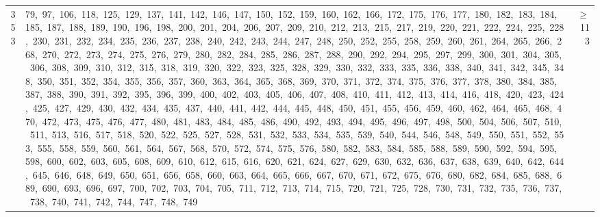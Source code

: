 \begin{longtable}{c|p{}|r}
353 & 79,\ 97,\ 106,\ 118,\ 125,\ 129,\ 137,\ 141,\ 142,\ 146,\ 147,\ 150,\ 152,\ 159,\ 160,\ 162,\ 166,\ 172,\ 175,\ 176,\ 177,\ 180,\ 182,\ 183,\ 184,\ 185,\ 187,\ 188,\ 189,\ 190,\ 196,\ 198,\ 200,\ 201,\ 204,\ 206,\ 207,\ 209,\ 210,\ 212,\ 213,\ 215,\ 217,\ 219,\ 220,\ 221,\ 222,\ 224,\ 225,\ 228,\ 230,\ 231,\ 232,\ 234,\ 235,\ 236,\ 237,\ 238,\ 240,\ 242,\ 243,\ 244,\ 247,\ 248,\ 250,\ 252,\ 255,\ 258,\ 259,\ 260,\ 261,\ 264,\ 265,\ 266,\ 268,\ 270,\ 272,\ 273,\ 274,\ 275,\ 276,\ 279,\ 280,\ 282,\ 284,\ 285,\ 286,\ 287,\ 288,\ 290,\ 292,\ 294,\ 295,\ 297,\ 299,\ 300,\ 301,\ 304,\ 305,\ 306,\ 308,\ 309,\ 310,\ 312,\ 315,\ 318,\ 319,\ 320,\ 322,\ 323,\ 325,\ 328,\ 329,\ 330,\ 332,\ 333,\ 335,\ 336,\ 338,\ 340,\ 341,\ 342,\ 345,\ 348,\ 350,\ 351,\ 352,\ 354,\ 355,\ 356,\ 357,\ 360,\ 363,\ 364,\ 365,\ 368,\ 369,\ 370,\ 371,\ 372,\ 374,\ 375,\ 376,\ 377,\ 378,\ 380,\ 384,\ 385,\ 387,\ 388,\ 390,\ 391,\ 392,\ 395,\ 396,\ 399,\ 400,\ 402,\ 403,\ 405,\ 406,\ 407,\ 408,\ 410,\ 411,\ 412,\ 413,\ 414,\ 416,\ 418,\ 420,\ 423,\ 424,\ 425,\ 427,\ 429,\ 430,\ 432,\ 434,\ 435,\ 437,\ 440,\ 441,\ 442,\ 444,\ 445,\ 448,\ 450,\ 451,\ 455,\ 456,\ 459,\ 460,\ 462,\ 464,\ 465,\ 468,\ 470,\ 472,\ 473,\ 475,\ 476,\ 477,\ 480,\ 481,\ 483,\ 484,\ 485,\ 486,\ 490,\ 492,\ 493,\ 494,\ 495,\ 496,\ 497,\ 498,\ 500,\ 504,\ 506,\ 507,\ 510,\ 511,\ 513,\ 516,\ 517,\ 518,\ 520,\ 522,\ 525,\ 527,\ 528,\ 531,\ 532,\ 533,\ 534,\ 535,\ 539,\ 540,\ 544,\ 546,\ 548,\ 549,\ 550,\ 551,\ 552,\ 553,\ 555,\ 558,\ 559,\ 560,\ 561,\ 564,\ 567,\ 568,\ 570,\ 572,\ 574,\ 575,\ 576,\ 580,\ 582,\ 583,\ 584,\ 585,\ 588,\ 589,\ 590,\ 592,\ 594,\ 595,\ 598,\ 600,\ 602,\ 603,\ 605,\ 608,\ 609,\ 610,\ 612,\ 615,\ 616,\ 620,\ 621,\ 624,\ 627,\ 629,\ 630,\ 632,\ 636,\ 637,\ 638,\ 639,\ 640,\ 642,\ 644,\ 645,\ 646,\ 648,\ 649,\ 650,\ 651,\ 656,\ 658,\ 660,\ 663,\ 664,\ 665,\ 666,\ 667,\ 670,\ 671,\ 672,\ 675,\ 676,\ 680,\ 682,\ 684,\ 685,\ 688,\ 689,\ 690,\ 693,\ 696,\ 697,\ 700,\ 702,\ 703,\ 704,\ 705,\ 711,\ 712,\ 713,\ 714,\ 715,\ 720,\ 721,\ 725,\ 728,\ 730,\ 731,\ 732,\ 735,\ 736,\ 737,\ 738,\ 740,\ 741,\ 742,\ 744,\ 747,\ 748,\ 749 & $\ge$ 113 \\

\end{longtable}
